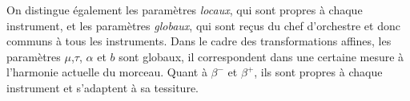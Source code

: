 On distingue également les paramètres \emph{locaux}, qui sont propres à chaque instrument, et les paramètres \emph{globaux}, qui sont reçus du chef d'orchestre et donc communs à tous les instruments. Dans le cadre des transformations affines, les paramètres $\mu$,$\tau$, $\alpha$  et $b$ sont globaux, il correspondent dans une certaine mesure à l'harmonie actuelle du morceau. Quant à $\beta^-$ et $\beta^+$, ils sont propres à chaque instrument et s'adaptent à sa tessiture.

